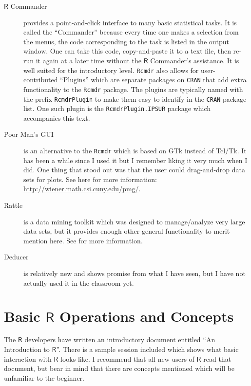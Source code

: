 \documentclass[captions=tableheading]{scrbook}
\begin{document}
\begin{description}
\item[\(\mathsf{R}\) Commander] provides a point-and-click interface to many basic statistical tasks. It is called the ``Commander'' because every time one makes a selection from the menus, the code corresponding to the task is listed in the output window. One can take this code, copy-and-paste it to a text file, then re-run it again at a later time without the \(\mathsf{R}\) Commander's assistance. It is well suited for the introductory level. \texttt{Rcmdr} also allows for user-contributed ``Plugins'' which are separate packages on \texttt{CRAN} that add extra functionality to the \texttt{Rcmdr} package. The plugins are typically named with the prefix \texttt{RcmdrPlugin} to make them easy to identify in the \texttt{CRAN} package list. One such plugin is the \texttt{RcmdrPlugin.IPSUR} package which accompanies this text.
\item[Poor Man's GUI] is an alternative to the \texttt{Rcmdr} which is based on GTk instead of Tcl/Tk. It has been a while since I used it but I remember liking it very much when I did. One thing that stood out was that the user could drag-and-drop data sets for plots. See here for more information: \href{http://wiener.math.csi.cuny.edu/pmg/}{http://wiener.math.csi.cuny.edu/pmg/}.
\item[Rattle] is a data mining toolkit which was designed to manage/analyze very large data sets, but it provides enough other general functionality to merit mention here. See \cite{rattle} for more information.
\item[Deducer] is relatively new and shows promise from what I have seen, but I have not actually used it in the classroom yet.
\end{description}
\section{Basic \(\mathsf{R}\) Operations and Concepts}
\label{sec-2-3}
\label{sec-Basic-R-Operations}


The \(\mathsf{R}\) developers have written an introductory document entitled ``An Introduction to \(\mathsf{R}\)''. There is a sample session included which shows what basic interaction with \(\mathsf{R}\) looks like. I recommend that all new users of \(\mathsf{R}\) read that document, but bear in mind that there are concepts mentioned which will be unfamiliar to the beginner.
\end{document}
